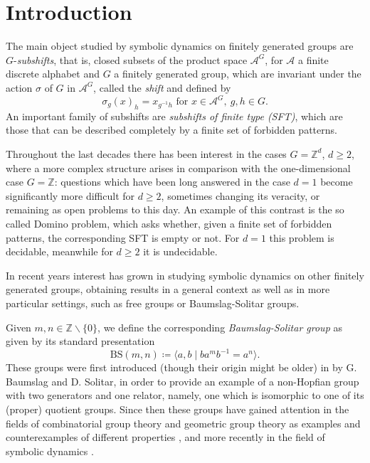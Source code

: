 \documentclass[cupthm,crop,info]{CUP-JNL-ETS}%
\theoremstyle{cupplain}
\theoremstyle{cupdefinition}
\theoremstyle{cupremark}
\theoremstyle{cupproof}
\numberwithin{equation}{section}
\begin{document}
	\section{Introduction}
\label{section:introduction}
The main object studied by symbolic dynamics on finitely generated groups are $G$-\textit{subshifts}, that is, closed subsets of the product space $\mathcal{A}^G$, for $\mathcal{A}$ a finite discrete alphabet and $G$ a finitely generated group, which are invariant under the action $\sigma$ of $G$ in $\mathcal{A}^G$, called the \textit{shift} and defined by
$$\sigma_g(x)_h=x_{g^{-1}h}\text{ for }x\in\mathcal{A}^G,\ g,h\in G.$$
An important family of subshifts are \textit{subshifts of finite type (SFT)}, which are those that can be described completely by a finite set of forbidden patterns.

Throughout the last decades there has been interest in the cases $G=\mathbb{Z}^d$, $d\ge 2$, where a more complex structure arises in comparison with the one-dimensional case $G=\mathbb{Z}$: questions which have been long answered in the case $d=1$ become significantly more difficult for $d\ge 2$, sometimes changing its veracity, or remaining as open problems to this day. An example of this contrast is the so called Domino problem, which asks whether, given a finite set of forbidden patterns, the corresponding SFT is empty or not. For $d=1$ this problem is decidable, meanwhile for $d\ge 2$ it is undecidable.

In recent years interest has grown in studying symbolic dynamics on other finitely generated groups, obtaining results in a general context as well as in more particular settings, such as free groups or Baumslag-Solitar groups.

Given $m,n\in \mathbb{Z}\backslash \{0\}$, we define the corresponding \textit{Baumslag-Solitar group} as given by its standard presentation
$$
\mathrm{BS}(m,n)\coloneqq \langle a,b \mid ba^mb^{-1}=a^n \rangle.
$$
These groups were first introduced (though their origin might be older) in \cite{baumslag_solitar_1962} by G. Baumslag and D. Solitar, in order to provide an example of a non-Hopfian group with two generators and one relator, namely, one which is isomorphic to one of its (proper) quotient groups. Since then these groups have gained attention in the fields of combinatorial group theory and geometric group theory as examples and counterexamples of different properties \cite{harpe_2003,meskin_1972}, and more recently in the field of symbolic dynamics \cite{aubrun_kari_2013,cyr2016distortion,esnay2020weakly}.
\end{document}
